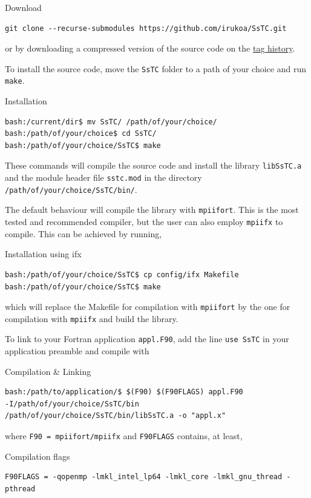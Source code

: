 \documentclass[10pt,a4paper]{article}
\begin{document}
\begin{codebox}{Download}
\begin{verbatim}
git clone --recurse-submodules https://github.com/irukoa/SsTC.git
\end{verbatim}
\end{codebox}
or by downloading a compressed version of the source code on the \href{https://github.com/irukoa/SsTC/tags}{tag history}.

To install the source code, move the \verb|SsTC| folder to a path of your choice and run \verb|make|.
\begin{codebox}{Installation}
\begin{verbatim}
bash:/current/dir$ mv SsTC/ /path/of/your/choice/
bash:/path/of/your/choice$ cd SsTC/
bash:/path/of/your/choice/SsTC$ make
\end{verbatim}
\end{codebox}
These commands will compile the source code and install the library \verb|libSsTC.a| and the module header file \verb|sstc.mod| in the directory \verb|/path/of/your/choice/SsTC/bin/|.

The default behaviour will compile the library with \verb|mpiifort|. This is the most tested and recommended compiler, but the user can also employ \verb|mpiifx| to compile. This can be achieved by running,
\begin{codebox}{Installation using ifx}
\begin{verbatim}
bash:/path/of/your/choice/SsTC$ cp config/ifx Makefile
bash:/path/of/your/choice/SsTC$ make
\end{verbatim}
\end{codebox}
which will replace the Makefile for compilation with \verb|mpiifort| by the one for compilation with \verb|mpiifx| and build the library.

To link to your Fortran application \verb|appl.F90|, add the line \verb|use SsTC| in your application preamble and compile with
\begin{codebox}{Compilation \& Linking}
\begin{verbatim}
bash:/path/to/application/$ $(F90) $(F90FLAGS) appl.F90
-I/path/of/your/choice/SsTC/bin
/path/of/your/choice/SsTC/bin/libSsTC.a -o "appl.x"
\end{verbatim}
\end{codebox}
where \verb|F90 = mpiifort/mpiifx| and \verb|F90FLAGS| contains, at least,
\begin{codebox}{Compilation flags}
\begin{verbatim}
F90FLAGS = -qopenmp -lmkl_intel_lp64 -lmkl_core -lmkl_gnu_thread -pthread
\end{verbatim}
\end{codebox}
\end{document}
